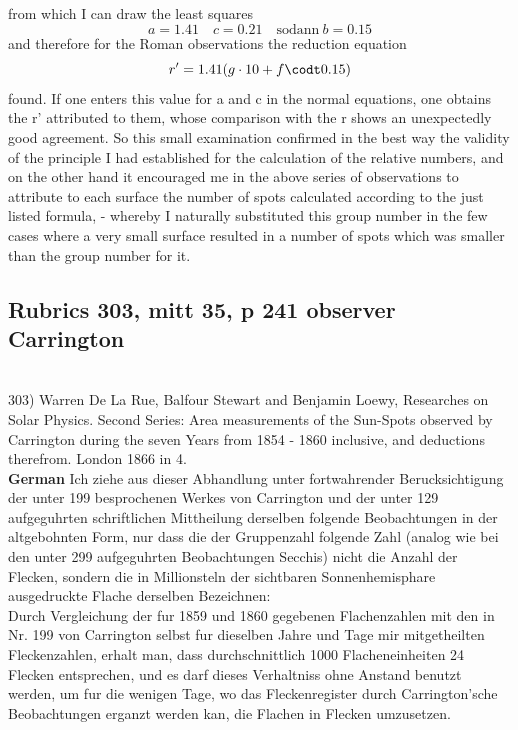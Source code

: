 \documentclass[12pt]{article}
\begin{document}
from which I can draw the least squares 
$$a=1.41 \quad c=0.21 \quad \text{sodann}\ b=0.15$$
and therefore for the Roman observations the reduction equation
$$r' = 1.41(g\cdot 10 + f\codt 0.15)$$
found. If one enters this value for a and c in the normal equations, one obtains the r' attributed to them, whose comparison with the r shows an unexpectedly good agreement. So this small examination confirmed in the best way the validity of the principle I had established for the calculation of the relative numbers, and on the other hand it encouraged me in the above series of observations to attribute to each surface the number of spots calculated according to the just listed formula, - whereby I naturally substituted this group number in the few cases where a very small surface resulted in a number of spots which was smaller than the group number for it.

\subsection{Rubrics 303, mitt 35, p 241 observer Carrington}\label{rubrics 303, carrington}\\

303) Warren De La Rue, Balfour Stewart and Benjamin Loewy, Researches on Solar Physics. Second Series: Area measurements of the Sun-Spots observed by Carrington during the seven Years from 1854 - 1860 inclusive, and deductions therefrom. London 1866 in 4.\\

\textbf{German}
Ich ziehe aus dieser Abhandlung unter fortwahrender Berucksichtigung der unter 199 besprochenen Werkes von Carrington und der unter 129 aufgeguhrten schriftlichen Mittheilung derselben folgende Beobachtungen in der altgebohnten Form, nur dass die der Gruppenzahl folgende Zahl (analog wie bei den unter 299 aufgeguhrten Beobachtungen Secchis) nicht die Anzahl der Flecken, sondern die in Millionsteln der sichtbaren Sonnenhemisphare ausgedruckte Flache derselben Bezeichnen:\\

Durch Vergleichung der fur 1859 und 1860 gegebenen Flachenzahlen mit den in Nr. 199 von Carrington selbst fur dieselben Jahre und Tage mir mitgetheilten Fleckenzahlen, erhalt man, dass durchschnittlich 1000 Flacheneinheiten 24 Flecken entsprechen, und es darf dieses Verhaltniss ohne Anstand benutzt werden, um fur die wenigen Tage, wo das Fleckenregister durch Carrington'sche Beobachtungen erganzt werden kan, die Flachen in Flecken umzusetzen.\\
\end{document}
